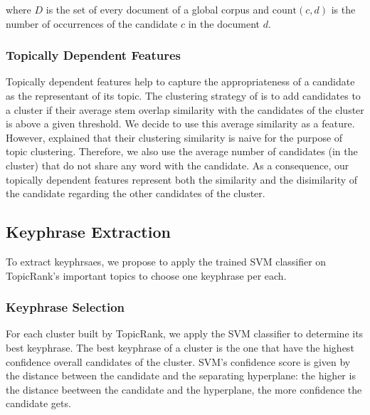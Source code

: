       \vspace{-1em}

      where $D$ is the set of every document of a global corpus and
      $\text{count}(c, d)$ is the number of occurrences of the candidate $c$ in
      the document $d$.

    \subsubsection{Topically Dependent Features}
    \label{subsubsec:topically_dependent_features}
      Topically dependent features help to capture the appropriateness of a
      candidate as the representant of its topic. The clustering strategy of
       is to add candidates to a cluster if their
      average stem overlap similarity with the candidates of the cluster is
      above a given threshold. We decide to use this average similarity as a
      feature. However,  explained that their
      clustering similarity is naive for the purpose of topic clustering.
      Therefore, we also use the average number of candidates (in the cluster)
      that do not share any word with the candidate. As a consequence, our
      topically dependent features represent both the similarity and the
      disimilarity of the candidate regarding the other candidates of the
      cluster.

  \subsection{Keyphrase Extraction}
  \label{subsec:keyphrase_extraction}
    To extract keyphrsaes, we propose to apply the trained SVM classifier on
    TopicRank's important topics to choose one keyphrase per each.

    \subsubsection{Keyphrase Selection}
    \label{subsubsec:keyphrase_selection}
      For each cluster built by TopicRank, we apply the SVM classifier to
      determine its best keyphrase. The best keyphrase of a cluster is the one
      that have the highest confidence overall candidates of the cluster. SVM's
      confidence score is given by the distance between the candidate and the
      separating hyperplane: the higher is the distance beetween the candidate
      and the hyperplane, the more confidence the candidate gets.

